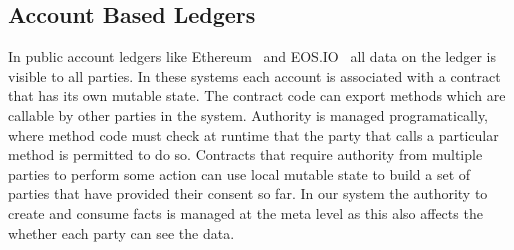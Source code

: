 




\subsection{Account Based Ledgers}
In public account ledgers like Ethereum~\cite{Wood2014:Ethereum} and EOS.IO~\cite{Lee2018:EOSIO} all data on the ledger is visible to all parties. In these systems each account is associated with a contract that has its own mutable state. The contract code can export methods which are callable by other parties in the system. Authority is managed programatically, where method code must check at runtime that the party that calls a particular method is permitted to do so. Contracts that require authority from multiple parties to perform some action can use local mutable state to build a set of parties that have provided their consent so far. In our system the authority to create and consume facts is managed at the meta level as this also affects the whether each party can see the data.



